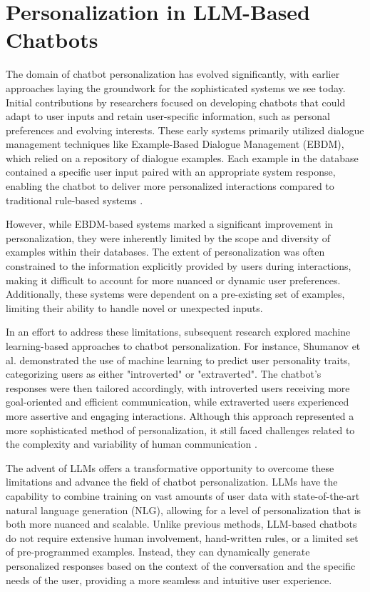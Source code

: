 \section{Personalization in LLM-Based Chatbots}

The domain of chatbot personalization has evolved significantly, with earlier approaches laying the groundwork for the sophisticated systems we see today. Initial contributions by researchers focused on developing chatbots that could adapt to user inputs and retain user-specific information, such as personal preferences and evolving interests. These early systems primarily utilized dialogue management techniques like Example-Based Dialogue Management (EBDM), which relied on a repository of dialogue examples. Each example in the database contained a specific user input paired with an appropriate system response, enabling the chatbot to deliver more personalized interactions compared to traditional rule-based systems \cite{kim2015acquisition, bang2015example}.

However, while EBDM-based systems marked a significant improvement in personalization, they were inherently limited by the scope and diversity of examples within their databases. The extent of personalization was often constrained to the information explicitly provided by users during interactions, making it difficult to account for more nuanced or dynamic user preferences. Additionally, these systems were dependent on a pre-existing set of examples, limiting their ability to handle novel or unexpected inputs.

In an effort to address these limitations, subsequent research explored machine learning-based approaches to chatbot personalization. For instance, Shumanov et al. demonstrated the use of machine learning to predict user personality traits, categorizing users as either "introverted" or "extraverted". The chatbot's responses were then tailored accordingly, with introverted users receiving more goal-oriented and efficient communication, while extraverted users experienced more assertive and engaging interactions. Although this approach represented a more sophisticated method of personalization, it still faced challenges related to the complexity and variability of human communication \cite{shumanov2021making}.

The advent of LLMs offers a transformative opportunity to overcome these limitations and advance the field of chatbot personalization. LLMs have the capability to combine training on vast amounts of user data with state-of-the-art natural language generation (NLG), allowing for a level of personalization that is both more nuanced and scalable. Unlike previous methods, LLM-based chatbots do not require extensive human involvement, hand-written rules, or a limited set of pre-programmed examples. Instead, they can dynamically generate personalized responses based on the context of the conversation and the specific needs of the user, providing a more seamless and intuitive user experience.

